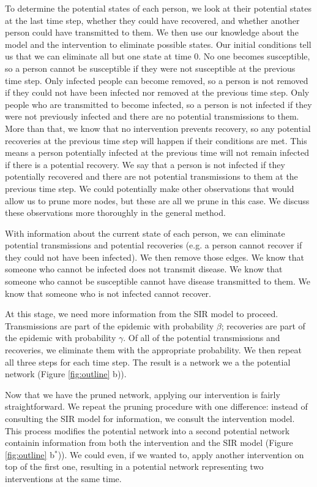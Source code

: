 \documentclass[PTRSB]{rsos}
\begin{document}
\begin{multicols}{2}
To determine the potential states of each person, we look at their potential states at the last time step, whether they could have recovered, and whether another person could have transmitted to them.
We then use our knowledge about the model and the intervention to eliminate possible states.
Our initial conditions tell us that we can eliminate all but one state at time $0$.
No one becomes susceptible, so a person cannot be susceptible if they were not susceptible at the previous time step. %
Only infected people can become removed, so a person is not removed if they could not have been infected nor removed at the previous time step.
Only people who are transmitted to become infected, so a person is not infected if they were not previously infected and there are no potential transmissions to them.
More than that, we know that no intervention prevents recovery, so any potential recoveries at the previous time step will happen if their conditions are met.
This means a person potentially infected at the previous time will not remain infected if there is a potential recovery.
We say that a person is not infected if they potentially recovered and there are not potential transmissions to them at the previous time step.
We could potentially make other observations that would allow us to prune more nodes, but these are all we prune in this case.
We discuss these observations more thoroughly in the general method.

With information about the current state of each person, we can eliminate potential transmissions and potential recoveries (e.g. a person cannot recover if they could not have been infected).
We then remove those edges.
We know that someone who cannot be infected does not transmit disease.
We know that someone who cannot be susceptible cannot have disease transmitted to them.
We know that someone who is not infected cannot recover.

At this stage, we need more information from the SIR model to proceed.
Transmissions are part of the epidemic with probability $\beta$; recoveries are part of the epidemic with probability $\gamma$.
Of all of the potential transmissions and recoveries, we eliminate them with the appropriate probability.
We then repeat all three steps for each time step.
The result is a network we a the potential network (Figure \ref{fig:outline} b)).

Now that we have the pruned network, applying our intervention is fairly straightforward.
We repeat the pruning procedure with one difference: instead of consulting the SIR model for information, we consult the intervention model.
This process modifies the potential network into a second potential network containin information from both the intervention and the SIR model (Figure \ref{fig:outline} b${}^*$)).
We could even, if we wanted to, apply another intervention on top of the first one, resulting in a potential network representing two interventions at the same time.


\end{multicols}
\end{document}
